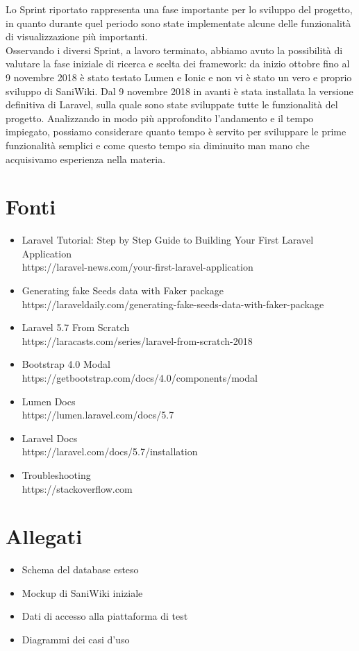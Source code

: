 \documentclass[twoside]{supsistudent}
\begin{document}
Lo Sprint riportato rappresenta una fase importante per lo sviluppo del progetto, in quanto durante quel periodo sono state implementate alcune delle funzionalità di visualizzazione più importanti.\\
Osservando i diversi Sprint, a lavoro terminato, abbiamo avuto la possibilità di valutare la fase iniziale di ricerca e scelta dei framework: da inizio ottobre fino al 9 novembre 2018 è stato testato Lumen e Ionic e non vi è stato un vero e proprio sviluppo di SaniWiki. Dal 9 novembre 2018 in avanti è stata installata la versione definitiva di Laravel, sulla quale sono state sviluppate tutte le funzionalità del progetto. Analizzando in modo più approfondito l'andamento e il tempo impiegato, possiamo considerare quanto tempo è servito per sviluppare le prime funzionalità semplici e come questo tempo sia diminuito man mano che acquisivamo esperienza nella materia.





\chapter{Fonti}
\begin{itemize}
\item Laravel Tutorial: Step by Step Guide to Building Your First Laravel Application\\
https://laravel-news.com/your-first-laravel-application
\item Generating fake Seeds data with Faker package\\
https://laraveldaily.com/generating-fake-seeds-data-with-faker-package
\item Laravel 5.7 From Scratch\\
https://laracasts.com/series/laravel-from-scratch-2018
\item Bootstrap 4.0 Modal\\
https://getbootstrap.com/docs/4.0/components/modal
\item Lumen Docs\\
https://lumen.laravel.com/docs/5.7
\item Laravel Docs\\
https://laravel.com/docs/5.7/installation
\item Troubleshooting\\
https://stackoverflow.com
\end{itemize}





\chapter{Allegati}
\begin{itemize}
\item Schema del database esteso
\item Mockup di SaniWiki iniziale
\item Dati di accesso alla piattaforma di test
\item Diagrammi dei casi d'uso
\end{itemize}


\newpage
\end{document}
